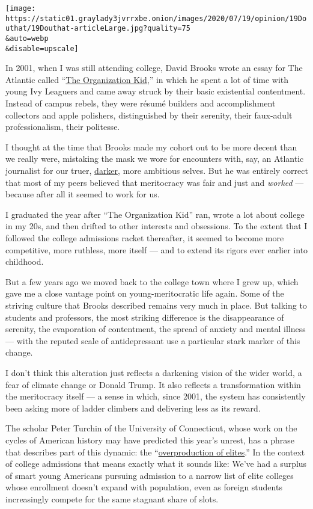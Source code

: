 \texttt{[image: https://static01.graylady3jvrrxbe.onion/images/2020/07/19/opinion/19Douthat/19Douthat-articleLarge.jpg?quality=75\\\&auto=webp\\\&disable=upscale]}

In 2001, when I was still attending college, David Brooks wrote an essay
for The Atlantic called
``\href{https://www.theatlantic.com/magazine/archive/2001/04/the-organization-kid/302164/}{The
Organization Kid},'' in which he spent a lot of time with young Ivy
Leaguers and came away struck by their basic existential contentment.
Instead of campus rebels, they were résumé builders and accomplishment
collectors and apple polishers, distinguished by their serenity, their
faux-adult professionalism, their politesse.

I thought at the time that Brooks made my cohort out to be more decent
than we really were, mistaking the mask we wore for encounters with,
say, an Atlantic journalist for our truer,
\href{https://www.nationalreview.com/magazine/2010/10/18/film-what-makes-preppy-run/}{darker},
more ambitious selves. But he was entirely correct that most of my peers
believed that meritocracy was fair and just and \emph{worked} ---
because after all it seemed to work for us.

I graduated the year after ``The Organization Kid'' ran, wrote a lot
about college in my 20s, and then drifted to other interests and
obsessions. To the extent that I followed the college admissions racket
thereafter, it seemed to become more competitive, more ruthless, more
itself --- and to extend its rigors ever earlier into childhood.

But a few years ago we moved back to the college town where I grew up,
which gave me a close vantage point on young-meritocratic life again.
Some of the striving culture that Brooks described remains very much in
place. But talking to students and professors, the most striking
difference is the disappearance of serenity, the evaporation of
contentment, the spread of anxiety and mental illness --- with the
reputed scale of antidepressant use a particular stark marker of this
change.

I don't think this alteration just reflects a darkening vision of the
wider world, a fear of climate change or Donald Trump. It also reflects
a transformation within the meritocracy itself --- a sense in which,
since 2001, the system has consistently been asking more of ladder
climbers and delivering less as its reward.

The scholar Peter Turchin of the University of Connecticut, whose work
on the cycles of American history may have predicted this year's unrest,
has a phrase that describes part of this dynamic: the
``\href{http://peterturchin.com/age-of-discord/}{overproduction of
elites}.'' In the context of college admissions that means exactly what
it sounds like: We've had a surplus of smart young Americans pursuing
admission to a narrow list of elite colleges whose enrollment doesn't
expand with population, even as foreign students increasingly compete
for the same stagnant share of slots.

